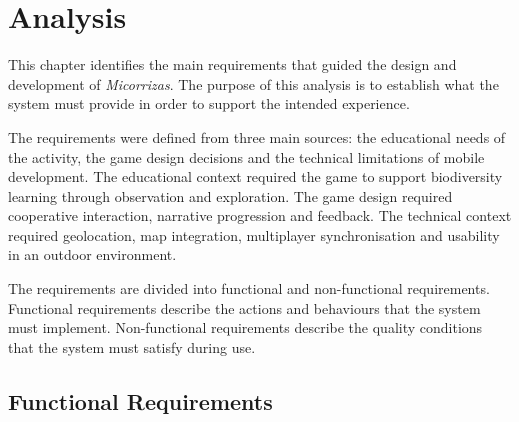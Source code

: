 \chapter{Analysis}
This chapter identifies the main requirements that guided the design and development of \textit{Micorrizas}. The purpose of this analysis is to establish what the system must provide in order to support the intended experience. 

The requirements were defined from three main sources: the educational needs of the activity, the game design decisions and the technical limitations of mobile development. The educational context required the game to support biodiversity learning through observation and exploration. The game design required cooperative interaction, narrative progression and feedback. The technical context required geolocation, map integration, multiplayer synchronisation and usability in an outdoor environment.

The requirements are divided into functional and non-functional requirements. Functional requirements describe the actions and behaviours that the system must implement. Non-functional requirements describe the quality conditions that the system must satisfy during use.

\section{Functional Requirements}

\renewcommand{\arraystretch}{1}



